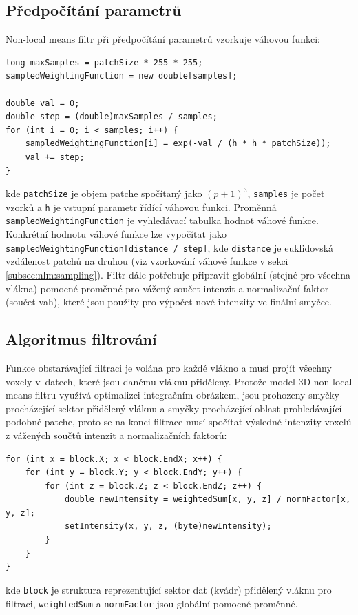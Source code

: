 \subsection*{Předpočítání parametrů}
Non-local means filtr při předpočítání parametrů vzorkuje váhovou funkci:
\begin{verbatim}
long maxSamples = patchSize * 255 * 255;
sampledWeightingFunction = new double[samples];

double val = 0;
double step = (double)maxSamples / samples;
for (int i = 0; i < samples; i++) {
    sampledWeightingFunction[i] = exp(-val / (h * h * patchSize));
    val += step;
}
\end{verbatim}
kde \texttt{patchSize} je objem patche spočítaný jako $(p + 1)^3$, \texttt{samples} je počet vzorků a \texttt{h} je vstupní parametr řídící váhovou funkci. Proměnná \texttt{sampledWeightingFunction} je vyhledávací tabulka hodnot váhové funkce. Konkrétní hodnotu váhové funkce lze vypočítat jako \texttt{sampledWeightingFunction[distance / step]}, kde \texttt{distance} je euklidovská vzdálenost patchů na druhou (viz vzorkování váhové funkce v sekci \ref{subsec:nlm:sampling}). Filtr dále potřebuje připravit globální (stejné pro všechna vlákna) pomocné proměnné pro vážený součet intenzit a normalizační faktor (součet vah), které jsou použity pro výpočet nové intenzity ve finální smyčce.

\subsection*{Algoritmus filtrování}
Funkce obstarávající filtraci je volána pro každé vlákno a musí projít všechny voxely v~datech, které jsou danému vláknu přiděleny. Protože model 3D non-local means filtru využívá optimalizci integračním obrázkem, jsou prohozeny smyčky procházející sektor přidělený vláknu a smyčky procházející oblast prohledávající podobné patche, proto se na konci filtrace musí spočítat výsledné intenzity voxelů z vážených součtů intenzit a normalizačních faktorů:
\begin{verbatim}
for (int x = block.X; x < block.EndX; x++) {
    for (int y = block.Y; y < block.EndY; y++) {
        for (int z = block.Z; z < block.EndZ; z++) {
            double newIntensity = weightedSum[x, y, z] / normFactor[x, y, z];
            setIntensity(x, y, z, (byte)newIntensity);
        }
    }
}
\end{verbatim}
kde \texttt{block} je struktura reprezentující sektor dat (kvádr) přidělený vláknu pro filtraci, \texttt{weightedSum} a \texttt{normFactor} jsou globální pomocné proměnné.

